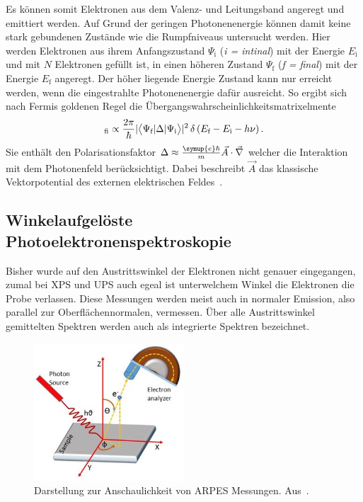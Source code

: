             Es können somit Elektronen aus dem Valenz- und Leitungsband angeregt und emittiert werden. 
            Auf Grund der geringen Photonenenergie können damit keine stark gebundenen Zustände wie die Rumpfniveaus untersucht werden.
            Hier werden Elektronen aus ihrem Anfangszustand $\Psi_\text{i}$ (\textit{i = intinal}) mit der Energie $E_\text{i}$ und mit $N$ Elektronen gefüllt ist, in einen höheren Zustand $\Psi_\text{f}$ (\textit{f = final}) mit der Energie $E_\text{f}$  angeregt.
            Der höher liegende Energie Zustand kann nur erreicht werden, wenn die eingestrahlte Photonenenergie dafür ausreicht.
            So ergibt sich nach Fermis goldenen Regel die Übergangswahrscheinlichkeitsmatrixelmente
            \begin{equation}
                _\text{fi} \propto \frac{2\pi}{\hbar} \lvert\bigl<\Psi_\text{f}|\Delta|\Psi_\text{i}\bigr>\rvert^2 \, \delta\left(E_\text{f}-E_\text{i}-h\nu\right).
                \label{eqn:Fermi_gold}
            \end{equation}
            Sie enthält den Polarisationsfaktor $\Delta \approx \frac{\symup{e}\hbar}{m}\vec{A}\cdot\vec{\nabla}$ welcher die Interaktion mit dem Photonenfeld berücksichtigt.
            Dabei beschreibt $\vec{A}$ das klassische Vektorpotential des externen elektrischen Feldes~\cite{cao_theory_2010}.



        \subsection{Winkelaufgelöste Photoelektronenspektroskopie} \label{sec:UPS}
            Bisher wurde  auf den Austrittswinkel der Elektronen nicht genauer eingegangen, zumal bei XPS und UPS auch egeal ist unterwelchem Winkel die Elektronen die Probe verlassen.
            Diese Messungen werden meist auch in normaler Emission, also parallel zur Oberflächennormalen, vermessen.
            Über alle Austrittswinkel gemittelten Spektren werden auch als integrierte Spektren bezeichnet.
            \begin{figure}
                \centering
                \includegraphics[width=0.5\textwidth]{./content/ARPES}
                \caption{Darstellung zur Anschaulichkeit von ARPES Messungen. Aus~\cite{ARPES}.}
                \label{fig:ARPES}
            \end{figure}

